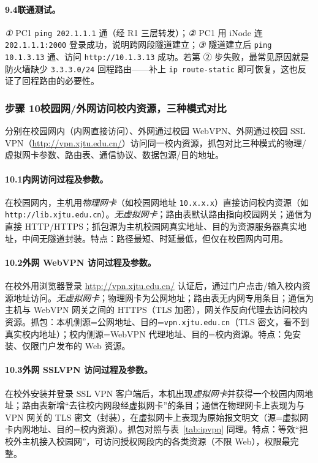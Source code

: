 \documentclass[12pt,a4paper]{article}
\begin{document}
\paragraph{9.4\quad 联通测试。}
\emph{①} PC1 \texttt{ping 202.1.1.1} 通（经 R1 三层转发）；\emph{②} PC1 用 iNode 连 \texttt{202.1.1.1:2000} 登录成功，说明跨网段隧道建立；\emph{③} 隧道建立后 \texttt{ping 10.1.3.13} 通、访问 \texttt{http://10.1.3.13} 成功。若第 ② 步失败，最常见原因就是防火墙缺少 \texttt{3.3.3.0/24} 回程路由——补上 \texttt{ip route-static} 即可恢复，这也反证了回程路由的必要性。

\subsubsection*{步骤 10\quad 校园网/外网访问校内资源，三种模式对比}
分别在校园网内（内网直接访问）、外网通过校园 WebVPN、外网通过校园 SSL VPN（\url{http://vpn.xjtu.edu.cn/}）访问同一校内资源，抓包对比三种模式的物理/虚拟网卡参数、路由表、通信协议、数据包源/目的地址。

\paragraph{10.1\quad 内网访问过程及参数。}
在校园网内，主机用\emph{物理网卡}（如校园网地址 \texttt{10.x.x.x}）直接访问校内资源（如 \texttt{http://lib.xjtu.edu.cn}）。\emph{无虚拟网卡}；路由表默认路由指向校园网关；通信为直接 HTTP/HTTPS；抓包源为主机校园网真实地址、目的为资源服务器真实地址，中间无隧道封装。特点：路径最短、时延最低，但仅在校园网内可用。

\paragraph{10.2\quad 外网 WebVPN 访问过程及参数。}
在校外用浏览器登录 \url{http://vpn.xjtu.edu.cn/} 认证后，通过门户点击/输入校内资源地址访问。\emph{无虚拟网卡}；物理网卡为公网地址；路由表无内网专用条目；通信为主机与 WebVPN 网关之间的 HTTPS（TLS 加密），网关作反向代理去访问校内资源。抓包：本机侧源=公网地址、目的=\texttt{vpn.xjtu.edu.cn}（TLS 密文，看不到真实校内地址）；校内侧源=WebVPN 代理地址、目的=校内资源。特点：免安装、仅限门户发布的 Web 资源。

\paragraph{10.3\quad 外网 SSLVPN 访问过程及参数。}
在校外安装并登录 SSL VPN 客户端后，本机出现\emph{虚拟网卡}并获得一个校园内网地址；路由表新增“去往校内网段经虚拟网卡”的条目；通信在物理网卡上表现为与 VPN 网关的 TLS 密文（封装），在虚拟网卡上表现为原始报文明文（源=虚拟网卡内网地址、目的=校内资源）。抓包对照与表~\ref{tab:ipvpn} 同理。特点：等效“把校外主机接入校园网”，可访问授权网段内的各类资源（不限 Web），权限最完整。
\end{document}
